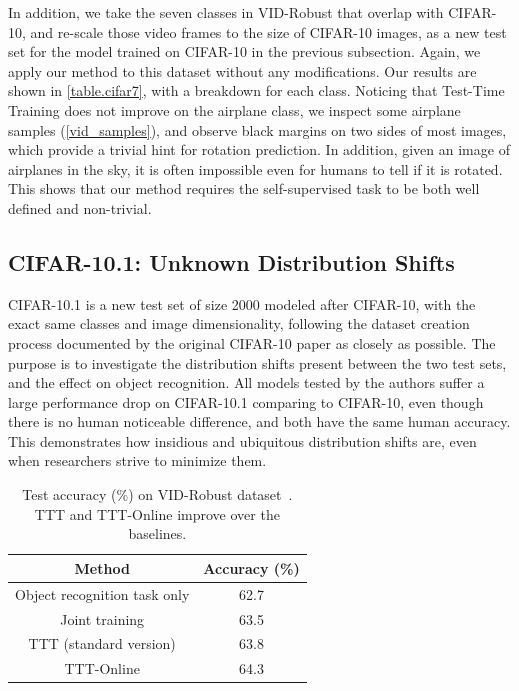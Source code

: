 \documentclass{article}
\theoremstyle{plain}
\theoremstyle{remark}
\theoremstyle{definition}
\begin{document}
In addition, we take the seven classes in VID-Robust that overlap with CIFAR-10, and re-scale those video frames to the size of CIFAR-10 images, as a new test set for the model trained on CIFAR-10 in the previous subsection. Again, we apply our method to this dataset without any modifications.
Our results are shown in \autoref{table.cifar7}, with a breakdown for each class. 
Noticing that Test-Time Training does not improve on the airplane class, we inspect some airplane samples (\autoref{vid_samples}), and observe black margins on two sides of most images, which provide a trivial hint for rotation prediction. 
In addition, given an image of airplanes in the sky, it is often impossible even for humans to tell if it is rotated.
This shows that our method requires the self-supervised task to be both well defined and non-trivial.

\subsection{CIFAR-10.1: Unknown Distribution Shifts}
\label{cifar10_new}
CIFAR-10.1 \citep{recht2018cifar} is a new test set of size 2000 modeled after CIFAR-10, with the exact same classes and image dimensionality, following the dataset creation process documented by the original CIFAR-10 paper as closely as possible.
The purpose is to investigate the distribution shifts present between the two test sets, and the effect on object recognition.
All models tested by the authors suffer a large performance drop on CIFAR-10.1 comparing to CIFAR-10,
even though there is no human noticeable difference, and both have the same human accuracy.
This demonstrates how insidious and ubiquitous distribution shifts are, even when researchers strive to minimize them.

\begin{table}
	\vspace{-1ex}
	\begin{center}{
			\begin{tabular}{c|c}  \toprule
				Method 									& Accuracy (\%) \\	\midrule
				{\small Object recognition task only} 								& 62.7\\  \midrule
				{\small Joint training {\scriptsize \citep{hendrycks2019using}}}						& 63.5\\  \midrule
				TTT	(standard version)	& 63.8\\  \midrule
				TTT-Online		& 64.3\\  \bottomrule
			\end{tabular}
			\caption{Test accuracy (\%) on VID-Robust dataset~\cite{shankar2019systematic}. 
			TTT and TTT-Online improve over the baselines.
			}\label{vidtable}
	}\end{center}
\end{table} 
\end{document}
